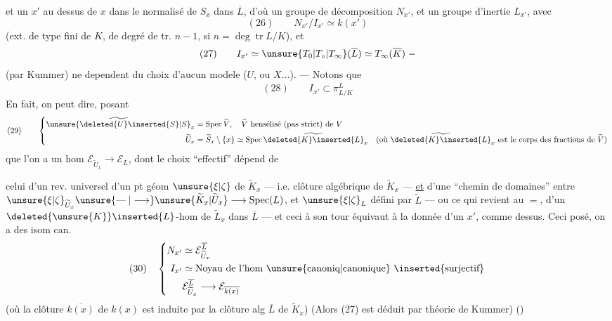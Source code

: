 et un $x'$ au dessus de $x$ dans le normalisé de $S_x$ dans $\overline L$, d'où un groupe de décomposition $N_{x'}$, et un groupe d'inertie $L_{x'}$, avec
\[
(26)\qquad N_{x'}/I_{x'}\simeq k(x')
\]
(ext. de type fini de $K$, de degré de tr. $n-1$, si $n=\deg\operatorname{tr}L/K$), et
\[
(27)\qquad I_{x'}\simeq\unsure{T_0|T_\circ|T_\infty}(\overline L)\simeq T_\infty(\overline K)\;-
\]
(par Kummer)   ne dependent du choix d'aucun  modele ($U$, ou $X\ldots$). --- Notons que
\[
(28)\qquad I_{x'}\subset\pi_{L/K}^{\overline L}
\]
En fait, on peut dire, posant
\[
(29)\qquad\left\{\begin{aligned}
\widetilde{\unsure{\deleted{U}\inserted{S}|S}}_x&=\operatorname{Spec}\widetilde V,\quad\widetilde V\text{ hensélisé (pas strict) de }V\\
\widetilde U_x&=\widetilde S_x\setminus\{x\}\simeq\operatorname{Spec}\widetilde{\deleted{K}\inserted{L}}_x\quad(\text{où }\widetilde{\deleted{K}\inserted{L}}_x\text{ est le corps des fractions de }\widetilde V)
\end{aligned}\right.
\]
que l'on a un hom  $\mathcal E_{\widetilde U_x}\longrightarrow\mathcal E_L$,  dont le choix ``effectif'' dépend de

celui d'un rev. universel   d'un pt géom $\unsure{\xi|\zeta}$ de $\widetilde K_x$ --- i.e.  clôture algébrique de $\widetilde K_x$ --- \uline{et} d'une  ``chemin de domaines'' entre $\unsure{\xi|\zeta}_{\widetilde U_x}\unsure{\mathrel{\text{---}}|\longrightarrow}\unsure{\widetilde K_x|\widetilde U_x}\longrightarrow\operatorname{Spec}(L)$, et $\unsure{\xi|\zeta}_L$ défini par $\widetilde L$ --- ou ce qui revient au $=$,  d'un $\deleted{\unsure{K}}\inserted{L}$-hom de   $\widetilde L_x$ dans $\overline L$ --- et ceci à son tour équivaut à la donnée d'un $x'$,  comme dessus. Ceci posé, on a des isom can.
\[
(30)\quad\left\{\begin{aligned}
N_{x'}&\simeq\mathcal E_{\widetilde U_x}^{\overline L}\\
I_{x'}&\simeq\text{Noyau de l'hom \unsure{canoniq|canonique} }\inserted{\text{surjectif}}\\
&\mathcal E_{\widetilde U_x}^{\overline L}\longrightarrow\mathcal E_{\overline{k(x)}}
\end{aligned}\right.
\]
(où la clôture  $\overline{k(x)}$ de $k(x)$ est induite par la clôture alg $\overline L$ de $\widetilde K_x$)
(Alors (27) est déduit par théorie de Kummer)
()

